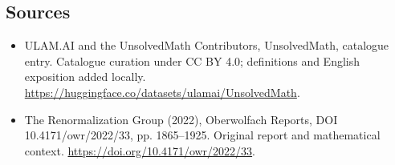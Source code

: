 \documentclass[11pt]{article}
\begin{document}
\subsection{Sources}
\begin{itemize}
\item[\hypertarget{source:statement:1}{S1}] ULAM.AI and the UnsolvedMath Contributors, UnsolvedMath, catalogue entry. Catalogue curation under CC BY 4.0; definitions and English exposition added locally.
\url{https://huggingface.co/datasets/ulamai/UnsolvedMath}.
\item[\hypertarget{source:statement:2}{S2}] The Renormalization Group (2022), Oberwolfach Reports, DOI 10.4171/owr/2022/33, pp. 1865--1925. Original report and mathematical context.
\url{https://doi.org/10.4171/owr/2022/33}.
\end{itemize}
\label{end:statement}
\end{document}
